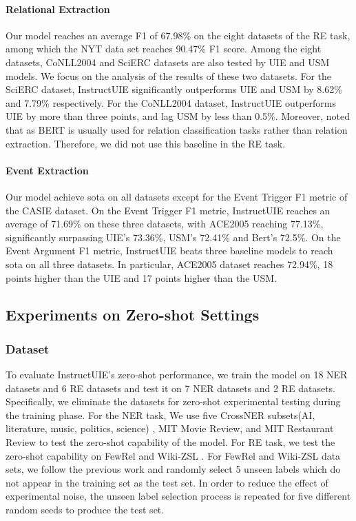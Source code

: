\documentclass[11pt]{article}
\begin{document}
\paragraph{Relational Extraction}
Our model reaches an average F1 of 67.98\% on the eight datasets of the RE task, among which the NYT data set reaches 90.47\% F1 score. Among the eight datasets, CoNLL2004 and SciERC datasets are also tested by UIE and USM models. We focus on the analysis of the results of these two datasets. For the SciERC dataset, InstructUIE significantly outperforms UIE and USM by 8.62\% and 7.79\% respectively. For the CoNLL2004 dataset, InstructUIE outperforms UIE by more than three points, and lag USM by less than 0.5\%.
Moreover, noted that as BERT is usually used for relation classification tasks rather than relation extraction. Therefore, we did not use this baseline in the RE task.





\paragraph{Event Extraction}
Our model achieve sota on all datasets except for the Event Trigger F1 metric of the CASIE dataset. On the Event Trigger F1 metric, InstructUIE reaches an average of 71.69\% on these three datasets, with ACE2005 reaching 77.13\%, significantly surpassing UIE's 73.36\%,  USM's 72.41\% and Bert's 72.5\%. On the Event Argument F1 metric, InstructUIE beats three baseline models to reach sota on all three datasets. In particular, ACE2005 dataset reaches 72.94\%, 18 points higher than the UIE and 17 points higher than the USM.



\subsection{Experiments on Zero-shot Settings}

\subsubsection{Dataset}
To evaluate InstructUIE's zero-shot performance, we train the model on 18 NER datasets and 6 RE datasets and test it on 7 NER datasets and 2 RE datasets. Specifically, we eliminate the datasets for zero-shot experimental testing during the training phase. 
For the NER task, We use five CrossNER subsets(AI, literature, music, politics, science) \cite{CrossNERDATASET}, MIT Movie Review, and MIT Restaurant Review \cite{MITReviewDataset} to test the zero-shot capability of the model. 
For RE task, we test the zero-shot capability on FewRel \cite{FewRelDATASET} and Wiki-ZSL \cite{Wiki-ZSLDATASET}. For FewRel and Wiki-ZSL data sets, we follow the previous work \cite{relationprompt} and randomly select 5 unseen labels which do not appear in the training set as the test set. In order to reduce the effect of experimental noise, the unseen label selection process is repeated for five different random seeds to produce the test set.
\end{document}
